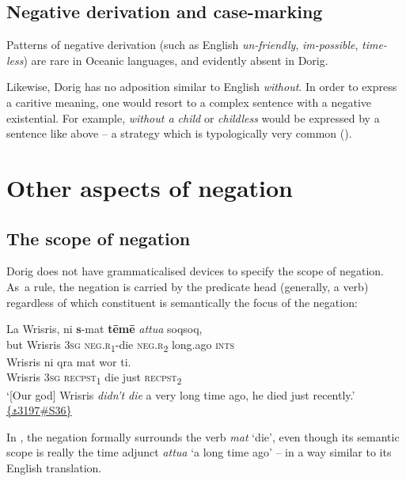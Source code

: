 \documentclass[output=paper,colorlinks,citecolor=brown,draft]{langscibook}
\begin{document}
\subsection{Negative derivation and case-marking}\label{sec:dor:3.3}

Patterns of negative derivation (such as English \textit{un-friendly}, \textit{im-possible}, \textit{time-less}) are rare in Oceanic languages, and evidently absent in Dorig.

Likewise, Dorig has no adposition similar to English \textit{without}. In order to express a caritive meaning, one would resort to a complex sentence with a negative existential. For example, \textit{without a child} or \textit{childless} would be expressed by a sentence like  above – a strategy which is typologically very common (\citealt[118]{Veselinova2013lexicalization}).

\section{Other aspects of negation}\label{sec:dor:4}
\subsection{The scope of negation}\label{sec:dor:4.1}

Dorig does not have grammaticalised devices to specify the scope of negation. As~a rule, the negation is carried by the predicate head (generally, a verb) regardless of which constituent is semantically the focus of the negation: 


\ea\label{ex:dor:wrisris} 
    \gll La Wrisris, ni \textbf{s}-mat \textbf{tēmē} \textit{attua} soqsoq, \\ 
         but Wrisris \textsc{3sg} \textsc{neg.r}\textsubscript{1}-die \textsc{neg.r}\textsubscript{2} long.ago \textsc{ints} \\
         
    \gll Wrisris ni qra mat wor ti. \\
        Wrisris \textsc{3sg} \textsc{recpst\textsubscript{1}} die just \textsc{recpst\textsubscript{2}}  \\
    \glt ‘[Our god] Wrisris \textit{didn’t die} a very long time ago, he died just recently.’  \href{https://doi.org/10.24397/pangloss-0003197#S36}{\{\texttt{⚓}3197\#S36\}}
\z 

\noindent In , the negation formally surrounds the verb \textit{mat} ‘die’, even though its semantic scope is really the time adjunct \textit{attua} ‘a long time ago’ – in a way similar to its English translation.
\end{document}
